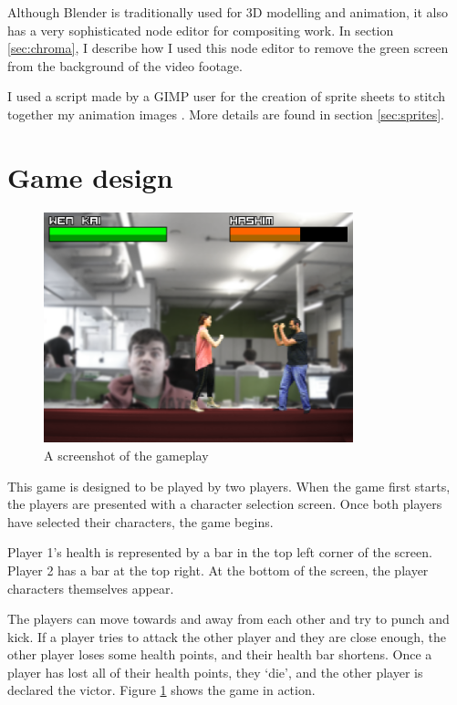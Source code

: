 \documentclass[11pt]{article}
\begin{document}
Although Blender is traditionally used for 3D modelling and animation, it also has a very sophisticated node editor for compositing work. In section \ref{sec:chroma}, I describe how I used this node editor to remove the green screen from the background of the video footage.

I used a script made by a GIMP user for the creation of sprite sheets to stitch together my animation images \cite{gimpscript}. More details are found in section \ref{sec:sprites}.

\section{Game design}
\begin{figure}[tp]
\centering
\includegraphics[width=0.8\textwidth]{screenshot.png}
\caption{A screenshot of the gameplay}
\label{fig:screenshot}
\end{figure}

This game is designed to be played by two players. When the game first starts, the players are presented with a character selection screen. Once both players have selected their characters, the game begins.

Player 1's health is represented by a bar in the top left corner of the screen. Player 2 has a bar at the top right. At the bottom of the screen, the player characters themselves appear. 

The players can move towards and away from each other and try to punch and kick. If a player tries to attack the other player and they are close enough, the other player loses some health points, and their health bar shortens. Once a player has lost all of their health points, they `die', and the other player is declared the victor. Figure \ref{fig:screenshot} shows the game in action.
\end{document}
